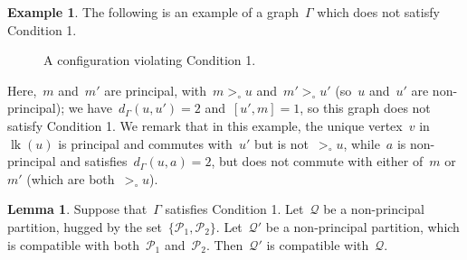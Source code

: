 \documentclass[11pt]{amsart}
\theoremstyle{definition}
\theoremstyle{definition}
\theoremstyle{definition}
\theoremstyle{definition}
\newtheorem{lemma}[theorem]{Lemma}
\newtheorem{example}[theorem]{Example}
\newcommand{\calQ}{\mathcal{Q}}
\newcommand{\calP}{\mathcal{P}} %
\newcommand{\link}[1]{\operatorname{lk}({#1})} %
\begin{document}
\begin{example}\label{eg:graph that breaks Condition 1 and the ensuing lemma}
    The following is an example of a graph~$\Gamma$ which does not satisfy Condition 1.

    \begin{figure}[H]
        \begin{center}
        \end{center}
        \caption{A configuration violating Condition 1.}
        \label{fig:doesn't satisfy Condition 1}
    \end{figure}

    Here,~$m$ and~$m'$ are principal, with~$m >_\circ u$ and~$m' >_\circ u'$ (so~$u$ and~$u'$ are non-principal); we have~$d_\Gamma(u, u') = 2$ and~$[u', m] = 1$, so this graph does not satisfy Condition 1. We remark that in this example, the unique vertex~$v$ in~$\link{u}$ is principal and commutes with~$u'$ but is not~$>_\circ u$, while~$a$ is non-principal and satisfies~$d_\Gamma(u, a) = 2$, but does not commute with either of~$m$ or~$m'$ (which are both~$>_\circ u$).
\end{example}

\begin{lemma}\label{lem:condition 1 (NEW)}
    Suppose that~$\Gamma$ satisfies Condition 1. Let~$\calQ$ be a non-principal partition, hugged by the set~$\{\calP_1, \calP_2\}$. Let~$\calQ'$ be a non-principal partition, which is compatible with both~$\calP_1$ and~$\calP_2$. Then~$\calQ'$ is compatible with~$\calQ$.
\end{lemma}
\end{document}
